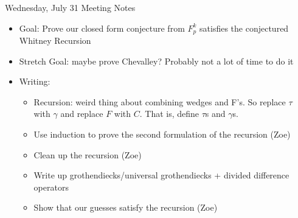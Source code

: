 Wednesday, July 31 Meeting Notes
\begin{itemize}
    \item Goal: Prove our closed form conjecture from $F_p^k$ satisfies the conjectured Whitney Recursion
    \item Stretch Goal: maybe prove Chevalley? Probably not a lot of time to do it
    \item Writing:
    \begin{itemize}
        \item Recursion: weird thing about combining wedges and F's. So replace $\tau$ with $\gamma$ and replace $F$ with $C$. That is, define $\tau$s and $\gamma$s.  
        \item Use induction to prove the second formulation of the recursion (Zoe)
        \item Clean up the recursion (Zoe)
        \item Write up grothendiecks/universal grothendiecks + divided difference operators
        \item Show that our guesses satisfy the recursion (Zoe)
    \end{itemize}
\end{itemize}